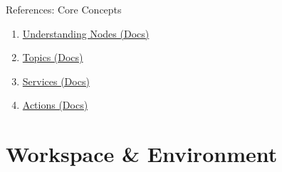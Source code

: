 \documentclass[aspectratio=169]{beamer}
\begin{document}
\begin{frame}{References: Core Concepts}
    \begin{enumerate}
        \item [EN] \href{https://docs.ros.org/en/humble/Tutorials/Beginner-CLI-Tools/Understanding-ROS2-Nodes/Understanding-ROS2-Nodes.html}{Understanding Nodes (Docs)}
        \item [EN] \href{https://docs.ros.org/en/humble/Tutorials/Beginner-CLI-Tools/Understanding-ROS2-Topics/Understanding-ROS2-Topics.html}{Topics (Docs)}
        \item [EN] \href{https://docs.ros.org/en/humble/Tutorials/Beginner-CLI-Tools/Understanding-ROS2-Services/Understanding-ROS2-Services.html}{Services (Docs)}
        \item [EN] \href{https://docs.ros.org/en/humble/Tutorials/Beginner-CLI-Tools/Understanding-ROS2-Actions/Understanding-ROS2-Actions.html}{Actions (Docs)}
    \end{enumerate}
\end{frame}


\section{Workspace \& Environment}
\end{document}
